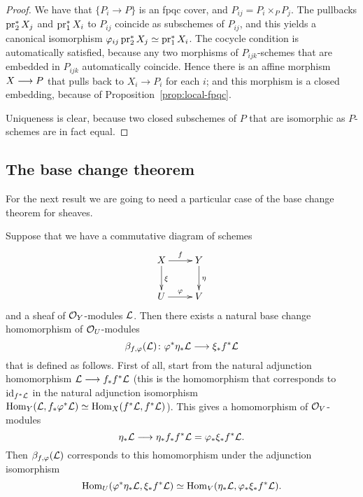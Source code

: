 \begin{4   STACKS}
\begin{4.3 Descent for morphisms of schemes}
\begin{proof}
We have that $\{P_{i} \to P\}$ is an fpqc cover, and $P_{ij} = P_{i}\times_{P}P_{j}$. The pullbacks $\operatorname{pr}_{2}^{*}X_{j}$ and $\operatorname{pr}_{1}^{*}X_{i}$ to $P_{ij}$ coincide as subschemes of $P_{ij}$, and this yields a canonical isomorphism $\varphi_{ij} \operatorname{pr}_{2}^{*}X_{j} \simeq \operatorname{pr}_{1}^{*}X_{i}$. The cocycle condition is automatically satisfied, because any two morphisms of $P_{ijk}$-schemes that are embedded in $P_{ijk}$ automatically coincide. Hence there is an affine morphism $X \arr P$ that pulls back to $X_{i} \to P_{i}$ for each $i$; and this morphism is a closed embedding, because of Proposition~\ref{prop:local-fpqc}.

Uniqueness is clear, because two closed subschemes of $P$ that are isomorphic as $P$-schemes are in fact equal.
\end{proof}


\subsection{The base change theorem}\label{subsec:base-change}

For the next result we are going to need a particular case of the base change theorem for \qc sheaves.

Suppose that we have a commutative diagram of schemes
   \begin{equation}\label{eq:cart-diagram}
   \xymatrix{
   X \ar[r]^f \ar[d]^\xi & Y\ar[d]^\eta\\
   U \ar[r]^\phi         & V
   }
   \end{equation}
and a sheaf of $\mathcal{O}_Y$-modules $\mathcal{L}$. Then there exists a natural base change homomorphism of $\mathcal{O}_U$-modules
   \[
   \beta_{f, \phi}(\cL) \colon \phi^*\eta_*\cL
   \arr \xi_* f ^* \cL
   \]
that is defined as follows. First of all, start from the natural adjunction homomorphism $\cL \arr f_*f^* \cL$ (this is the homomorphism that corresponds to $\mathrm{id}_{f^*\mathcal{L}}$ in the natural adjunction isomorphism $\operatorname{Hom}_Y(\mathcal{L}, f_*\varphi^* \mathcal{L}) \simeq \operatorname{Hom}_X (f^*\mathcal{L}, f^*\mathcal{L})$). This gives a homomorphism of $\mathcal{O}_V$-modules
   \[
   \eta_*\cL \arr \eta_*f_*f^* \cL =
   \phi_*\xi_* f^* \cL.
   \]
Then $\beta_{f, \varphi}(\mathcal{L})$ corresponds to this homomorphism under the adjunction isomorphism%
   \[
   \operatorname{Hom}_U(\varphi^*\eta_* \mathcal{L}, \xi_*f^* \mathcal{L}) \simeq
   \operatorname{Hom}_V(\eta_* \mathcal{L}, \varphi_*\xi_*f^* \mathcal{L}).
   \]


\end{4.3 Descent for morphisms of schemes}
\end{4   STACKS}
